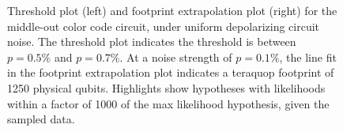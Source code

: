 \documentclass[onecolumn,unpublished,a4paper]{quantumarticle}
\theoremstyle{definition}
\theoremstyle{definition}
\theoremstyle{definition}
\begin{document}
\begin{figure}
    \centering
    \hfill
    \caption{
        Threshold plot (left) and footprint extrapolation plot (right) for the middle-out color code circuit, under uniform depolarizing circuit noise.
        The threshold plot indicates the threshold is between $p=0.5\%$ and $p=0.7\%$.
        At a noise strength of $p=0.1\%$, the line fit in the footprint extrapolation plot indicates a teraquop footprint of 1250 physical qubits.
        Highlights show hypotheses with likelihoods within a factor of 1000 of the max likelihood hypothesis, given the sampled data.
    }
    \label{fig:midout}
\end{figure}
\end{document}
